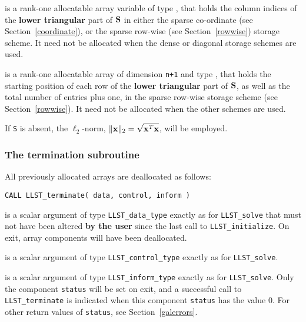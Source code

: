 \documentclass{galahad}
\newcommand{\packagename}{LLST}
\begin{document}
\begin{description}
\begin{description}
 is a rank-one allocatable array variable of type \integer,
that holds the column indices of the {\bf lower triangular} part of
${\mathbf{S}}$ in either the sparse co-ordinate
(see Section~\ref{coordinate}), or the sparse row-wise
(see Section~\ref{rowwise}) storage scheme.
It need not be allocated when the dense or diagonal storage schemes are used.

 is a rank-one allocatable array of dimension {\tt n+1} and type
\integer, that holds the starting position of
each row of the {\bf lower triangular} part of ${\mathbf{S}}$, as well
as the total number of entries plus one, in the sparse row-wise storage
scheme (see Section~\ref{rowwise}). It need not be allocated when the
other schemes are used.

\end{description}
If {\tt S} is absent, the $\ell_2$-norm, $\|{\mathbf{x}}\|_2 = \sqrt{{\mathbf{x}}^T {\mathbf{x}}}$,
will be employed.


\end{description}


\subsubsection{The  termination subroutine}
All previously allocated arrays are deallocated as follows:

\hskip0.5in
{\tt CALL \packagename\_terminate( data, control, inform )}

\begin{description}

 is a scalar \intentinout argument of type
{\tt \packagename\_data\_type}
exactly as for
{\tt \packagename\_solve}
that must not have been altered {\bf by the user} since the last call to
{\tt \packagename\_initialize}.
On exit, array components will have been deallocated.

 is a scalar \intentin argument of type
{\tt \packagename\_control\_type}
exactly as for
{\tt \packagename\_solve}.

 is a scalar \intentout argument of type
{\tt \packagename\_inform\_type}
exactly as for
{\tt \packagename\_solve}.
Only the component {\tt status} will be set on exit, and a
successful call to
{\tt \packagename\_terminate}
is indicated when this  component {\tt status} has the value 0.
For other return values of {\tt status}, see Section~\ref{galerrors}.

\end{description}
\end{document}
